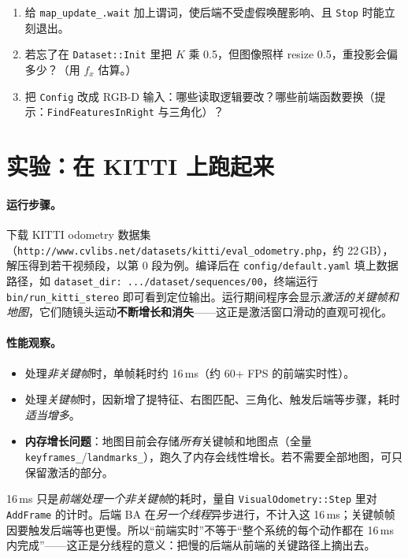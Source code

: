 \begin{practice}[练习]
\begin{enumerate}
  \item 给 \verb|map_update_.wait| 加上谓词，使后端不受虚假唤醒影响、且 \texttt{Stop} 时能立刻退出。
  \item 若忘了在 \texttt{Dataset::Init} 里把 $K$ 乘 0.5，但图像照样 resize 0.5，重投影会偏多少？（用 $f_x$ 估算。）
  \item 把 \texttt{Config} 改成 RGB-D 输入：哪些读取逻辑要改？哪些前端函数要换（提示：\texttt{FindFeaturesInRight} 与三角化）？
\end{enumerate}
\end{practice}

\section{实验：在 KITTI 上跑起来}
\label{sec:sys-experiment}

\paragraph{运行步骤。}
下载 KITTI odometry 数据集（\texttt{http://www.cvlibs.net/datasets/kitti/eval\_odometry.php}，约 22\,GB），解压得到若干视频段，以第 0 段为例。编译后在 \texttt{config/default.yaml} 填上数据路径，如 \verb|dataset_dir: .../dataset/sequences/00|，终端运行 \texttt{bin/run\_kitti\_stereo} 即可看到定位输出。运行期间程序会显示\emph{激活的关键帧和地图}，它们随镜头运动\textbf{不断增长和消失}——这正是激活窗口滑动的直观可视化。

\paragraph{性能观察。}
\begin{itemize}
  \item 处理\emph{非关键帧}时，单帧耗时约 16\,ms（约 60+ FPS 的前端实时性）。
  \item 处理\emph{关键帧}时，因新增了提特征、右图匹配、三角化、触发后端等步骤，耗时\emph{适当增多}。
  \item \textbf{内存增长问题}：地图目前会存储\emph{所有}关键帧和地图点（全量 \texttt{keyframes\_}/\texttt{landmarks\_}），跑久了内存会线性增长。若不需要全部地图，可只保留激活的部分。
\end{itemize}

\begin{pitfall}
16\,ms 只是\emph{前端处理一个非关键帧}的耗时，量自 \texttt{VisualOdometry::Step} 里对 \texttt{AddFrame} 的计时。后端 BA 在\emph{另一个线程}异步进行，不计入这 16\,ms；关键帧帧因要触发后端等也更慢。所以“前端实时”不等于“整个系统的每个动作都在 16\,ms 内完成”——这正是分线程的意义：把慢的后端从前端的关键路径上摘出去。
\end{pitfall}

